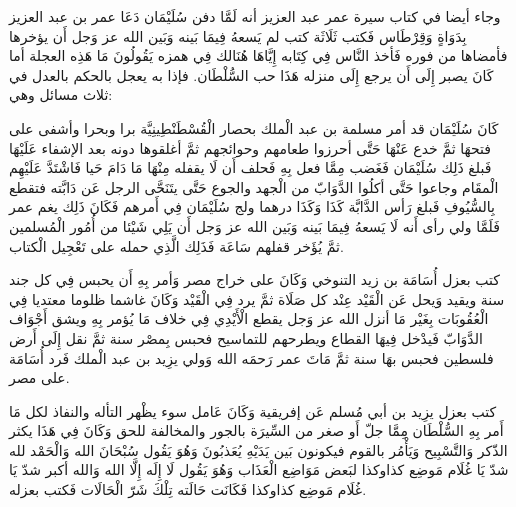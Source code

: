 وجاء أيضا في كتاب سيرة عمر عبد العزيز \cite{ibnAbdAlHakam_OmarIbnAbdAlAziz} أنه لَمَّا دفن سُلَيْمَان دَعَا عمر بن عبد العزيز بِدَوَاةٍ وَقِرْطَاس فَكتب ثَلَاثَة كتب لم يَسعهُ فِيمَا بَينه وَبَين الله عز وَجل أَن يؤخرها فأمضاها من فوره فَأخذ النَّاس فِي كِتَابه إِيَّاهَا هُنَالك فِي همزه يَقُولُونَ مَا هَذِه العجلة أما كَانَ يصبر إِلَى أَن يرجع إِلَى منزله هَذَا حب السُّلْطَان. فإذا به يعجل بالحكم بالعدل في ثلاث مسائل وهي: 
\begin{compactitem}
    \item كَانَ سُلَيْمَان قد أمر مسلمة بن عبد الْملك بحصار الْقُسْطَنْطِينِيَّة برا وبحرا وأشفى على فتحهَا ثمَّ خدع عَنْهَا حَتَّى أحرزوا طعامهم وحوائجهم ثمَّ أغلقوها دونه بعد الإشفاء عَلَيْهَا فَبلغ ذَلِك سُلَيْمَان فَغَضب مِمَّا فعل بِهِ فَحلف أَن لَا يقفله مِنْهَا مَا دَامَ حَيا فَاشْتَدَّ عَلَيْهِم الْمقَام وجاعوا حَتَّى أكلُوا الدَّوَابّ من الْجهد والجوع حَتَّى يتَنَحَّى الرجل عَن دَابَّته فتقطع بِالسُّيُوفِ فَبلغ رَأس الدَّابَّة كَذَا وَكَذَا درهما ولج سُلَيْمَان فِي أَمرهم فَكَانَ ذَلِك يغم عمر فَلَمَّا ولي رأى أَنه لَا يَسعهُ فِيمَا بَينه وَبَين الله عز وَجل أَن يَلِي شَيْئا من أُمُور الْمُسلمين ثمَّ يُؤَخر قفلهم سَاعَة فَذَلِك الَّذِي حمله على تَعْجِيل الْكتاب.
    \item كتب بعزل أُسَامَة بن زيد التنوخي وَكَانَ على خراج مصر وَأمر بِهِ أَن يحبس فِي كل جند سنة ويقيد وَيحل عَن الْقَيْد عِنْد كل صَلَاة ثمَّ يرد فِي الْقَيْد وَكَانَ غاشما ظلوما معتديا فِي الْعُقُوبَات بِغَيْر مَا أنزل الله عز وَجل يقطع الْأَيْدِي فِي خلاف مَا يُؤمر بِهِ ويشق أَجْوَاف الدَّوَابّ فَيدْخل فِيهَا القطاع ويطرحهم للتماسيح فحبس بِمصْر سنة ثمَّ نقل إِلَى أَرض فلسطين فحبس بهَا سنة ثمَّ مَاتَ عمر رَحمَه الله وَولي يزِيد بن عبد الْملك فَرد أُسَامَة على مصر.
    \item كتب بعزل يزِيد بن أبي مُسلم عَن إفريقية وَكَانَ عَامل سوء يظْهر التأله والنفاذ لكل مَا أَمر بِهِ السُّلْطَان مِمَّا جلّ أَو صغر من السِّيرَة بالجور والمخالفة للحق وَكَانَ فِي هَذَا يكثر الذّكر وَالتَّسْبِيح وَيَأْمُر بالقوم فيكونون بَين يَدَيْهِ يُعَذبُونَ وَهُوَ يَقُول سُبْحَانَ الله وَالْحَمْد لله شدّ يَا غُلَام مَوضِع كذاوكذا لبَعض مَوَاضِع الْعَذَاب وَهُوَ يَقُول لَا إِلَه إِلَّا الله وَالله أكبر شدّ يَا غُلَام مَوضِع كذاوكذا فَكَانَت حَالَته تِلْكَ شَرّ الْحَالَات فَكتب بعزله.
\end{compactitem}


